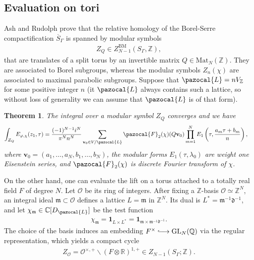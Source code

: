 \documentclass[a4paper,11pt]{amsart} %
\newcommand{\8}{\infty}
\newcommand{\Z}{\mathbb{Z}}
\newcommand{\id}{\mathbf{1}}
\newcommand{\vbf}{\mathbf{v}}
\newcommand{\four}{\pazocal{F}}
\newcommand{\BM}{\mathrm{BM}}
\newcommand{\GL}{\mathrm{GL}}
\newcommand{\R}{\mathbb{R}}
\newcommand{\Q}{\mathbb{Q}}
\newcommand{\C}{\mathbb{C}}
\newcommand{\dfrak}{\mathfrak{d}}
\newcommand{\m}{\mathfrak{m}}
\newcommand{\Ocal}{\mathcal{O}}
\newcommand{\Lcal}{\pazocal{L}}
\newcommand{\Mat}{\mathrm{Mat}}
\newcommand{\hooklongrightarrow}{\lhook\joinrel\longrightarrow}
\theoremstyle{mytheoremstyle}
\newtheorem{thm}{Theorem}[section]
\theoremstyle{remark}
\numberwithin{equation}{section}
\begin{document}
\subsection{Evaluation on tori} \label{evaluation on tori}
 Ash and Rudolph \cite{ashrud} prove that the relative homology of the Borel-Serre compactification $\overline{S}_\Gamma$ is spanned by modular symbols 
\begin{align}
Z_Q \in Z^{\BM}_{N-1}(S_\Gamma,\Z),
\end{align} that are translates of a split torus by an invertible matrix $Q \in \Mat_N(\Z)$. They are associated to Borel subgroups, whereas the modular symbols $Z_n(\chi)$ are associated to maximal parabolic subgroups. Suppose that $\Lcal=nV_\Z$ for some positive integer $n$ (it $\Lcal$ always contains such a lattice, so without loss of generality we can assume that $\Lcal$ is of that form).

\begin{thm} \label{theoremD} The integral over a modular symbol $Z_Q$ converges and we have
\begin{align}
\int_{Z_Q} E_{\varphi, \chi}(z_1,\tau)& = \frac{(-1)^{N-1}i^N}{\pi^{N}n^{N}} \sum_{\vbf_0 \in V/\Lcal}\four_2(\chi)(Q\vbf_0) \prod_{m=1}^N E_1\left (\tau,\frac{a_m\tau+b_m}{n} \right ),
\end{align}
where $\vbf_0=(a_1, \dots,a_N,b_1,\dots,b_N)$, the modular forms $E_1(\tau,\lambda_0)$ are weight one Eisenstein series, and $\four_2(\chi)$ is discrete Fourier transform of $\chi$.
\end{thm}


On the other hand, one can evaluate the lift on a torus attached to a totally real field $F$ of degree $N$. Let $\Ocal$ be its ring of integers. After fixing a $\Z$-basis $\Ocal \simeq \Z^N$,  an integral ideal $\m \subset \Ocal$ defines a lattice $L=\m$ in $\Z^N$. Its dual is $L^\ast=\m^{-1}\dfrak^{-1}$, and let $\chi_\m \in \C[D_{\Lcal}]$ be the test function
\begin{align}
\chi_\m=\id_{L \times L^\ast}=\id_{\m \times \m^{-1}\dfrak^{-1}}.
\end{align}
The choice of the basis induces an embedding $F^\times \hooklongrightarrow \GL_N(\Q)$ via the regular representation, which yields a compact cycle
\begin{align} \label{geodesic cycles}
Z_\Ocal = \Ocal^{\times,+} \backslash (F\otimes \R)^{1,+} \in Z_{N-1}(S_\Gamma;\Z).
\end{align}
\end{document}
